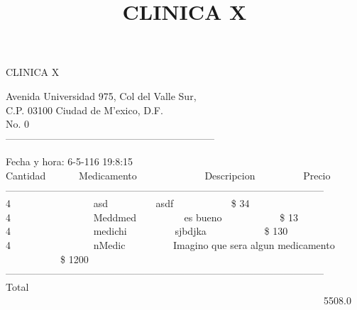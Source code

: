 \documentclass[10pt,a4paper]{letter}
\title{\bf CLINICA X}
\begin{document}
\begin{center}
{\scshape\LARGE CLINICA X\par}
{Avenida Universidad 975, Col del Valle Sur,\\}
{C.P. 03100 Ciudad de M'exico, D.F.}\\ 
{No. 0}\\ 
---------------------------------------------------------------
\end{center}

Fecha y hora: 6-5-116 19:8:15\\

Cantidad \ \ \ \ \ \ Medicamento \ \ \ \ \ \ \ \ \ \ \ \ \  Descripcion  \ \ \ \ \ \ \ \ \ Precio \\
------------------------------------------------------------------------------------------------ \\
4 \ \ \ \ \ \ \ \ \ \ \ \ \ \ \ \ asd \ \ \ \ \ \ \ \ \ asdf \ \ \ \ \ \ \ \ \ \ \ \$ 34 \\
4 \ \ \ \ \ \ \ \ \ \ \ \ \ \ \ \ Meddmed \ \ \ \ \ \ \ \ \ es bueno \ \ \ \ \ \ \ \ \ \ \ \$ 13 \\
4 \ \ \ \ \ \ \ \ \ \ \ \ \ \ \ \ medichi \ \ \ \ \ \ \ \ \ sjbdjka \ \ \ \ \ \ \ \ \ \ \ \$ 130 \\
4 \ \ \ \ \ \ \ \ \ \ \ \ \ \ \ \ nMedic \ \ \ \ \ \ \ \ \ Imagino que sera algun medicamento \ \ \ \ \ \ \ \ \ \ \ \$ 1200 \\

------------------------------------------------------------------------------------------------ \\
Total	\ \ \ \ \ \ \ \ \ \ \ \ \  \ \ \ \ \ \ \ \ \ \ \ \ \ \ \ \ \ \ \ \ \ \ \ \ \ \ \ \ \ \ \ \ \ \ \ \ \ \ \ \ \  \ \ \ \ \ \ \ \ \ \ 5508.0 \\
 
\end{document}
